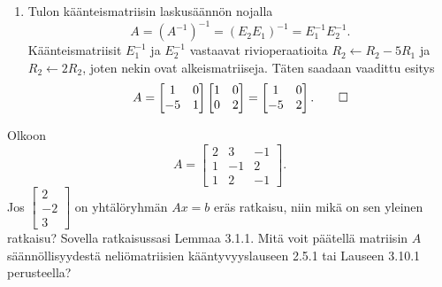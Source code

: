 \documentclass[11pt,a4paper]{amsart}
\begin{document}
\begin{solution}
\begin{enumerate}[label=(\alph*), leftmargin=*]
    \item Tulon käänteismatriisin laskusäännön nojalla
      \[
        A = (A^{-1})^{-1} = (E_2E_1)^{-1}
        = E_1^{-1}E_2^{-1}.
      \]
      Käänteismatriisit \(E_1^{-1}\) ja \(E_2^{-1}\) vastaavat
      rivioperaatioita \(R_2 \leftarrow R_2-5R_1\) ja
      \(R_2 \leftarrow 2R_2\), joten nekin ovat alkeismatriiseja.
      Täten saadaan vaadittu esitys
      \[
        A =
        \begin{bmatrix}
          1 & 0 \\
          -5 & 1
        \end{bmatrix}
        \begin{bmatrix}
          1 & 0 \\
          0 & 2
        \end{bmatrix}
        =
        \begin{bmatrix}
          1 & 0 \\
          -5 & 2
        \end{bmatrix}.\qedhere
      \]
  \end{enumerate}
\end{solution}

\begin{exercise}
  Olkoon
  \[
    A =
    \begin{bmatrix}
      2 & 3 & -1 \\
      1 & -1 & 2 \\
      1 & 2 & -1
    \end{bmatrix}.
  \]
  Jos \(
    \begin{bmatrix} 2 \\ -2 \\ 3
  \end{bmatrix}\) on yhtälöryhmän
  \(Ax = b\) eräs ratkaisu, niin mikä on sen yleinen ratkaisu? Sovella
  ratkaisussasi Lemmaa 3.1.1. Mitä voit päätellä matriisin \(A\)
  säännöllisyydestä neliömatriisien kääntyvyyslauseen 2.5.1 tai Lauseen
  3.10.1 perusteella?
\end{exercise}
\end{document}
